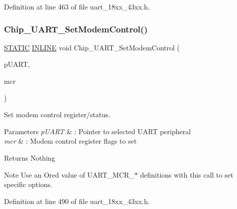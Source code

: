Definition at line 463 of file uart\+\_\+18xx\+\_\+43xx.\+h.

\mbox{\label{group___u_a_r_t__18_x_x__43_x_x_gad617968b795061ad0e4578aa79c4537d}} 
\subsubsection{\texorpdfstring{Chip\+\_\+\+U\+A\+R\+T\+\_\+\+Set\+Modem\+Control()}{Chip\_UART\_SetModemControl()}}
{\footnotesize\ttfamily \hyperlink{group___l_p_c___types___public___macros_ga10b2d890d871e1489bb02b7e70d9bdfb}{S\+T\+A\+T\+IC} \hyperlink{spifi__18xx__43xx_8h_a2eb6f9e0395b47b8d5e3eeae4fe0c116}{I\+N\+L\+I\+NE} void Chip\+\_\+\+U\+A\+R\+T\+\_\+\+Set\+Modem\+Control (\begin{DoxyParamCaption}\item[{\hyperlink{struct_l_p_c___u_s_a_r_t___t}{L\+P\+C\+\_\+\+U\+S\+A\+R\+T\+\_\+T} $\ast$}]{p\+U\+A\+RT,  }\item[{uint32\+\_\+t}]{mcr }\end{DoxyParamCaption})}



Set modem control register/status. 


\begin{DoxyParams}{Parameters}
{\em p\+U\+A\+RT} & \+: Pointer to selected U\+A\+RT peripheral \\
\hline
{\em mcr} & \+: Modem control register flags to set \\
\hline
\end{DoxyParams}
\begin{DoxyReturn}{Returns}
Nothing 
\end{DoxyReturn}
\begin{DoxyNote}{Note}
Use an Or\textquotesingle{}ed value of U\+A\+R\+T\+\_\+\+M\+C\+R\+\_\+$\ast$ definitions with this call to set specific options. 
\end{DoxyNote}


Definition at line 490 of file uart\+\_\+18xx\+\_\+43xx.\+h.

